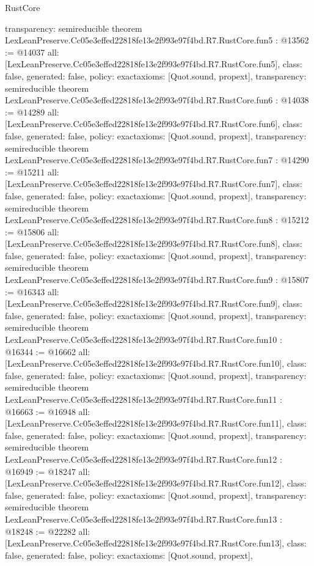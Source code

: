 \begin{lexlean}{RustCore}
\begin{coremodule}
{  transparency: semireducible
}
theorem LexLeanPreserve.Cc05e3effed22818fe13e2f993e97f4bd.R7.RustCore.fun5 : @13562 := @14037 {
  all: [LexLeanPreserve.Cc05e3effed22818fe13e2f993e97f4bd.R7.RustCore.fun5],
  class: false,
  generated: false,
  policy: exact{axioms: [Quot.sound, propext]},
  transparency: semireducible
}
theorem LexLeanPreserve.Cc05e3effed22818fe13e2f993e97f4bd.R7.RustCore.fun6 : @14038 := @14289 {
  all: [LexLeanPreserve.Cc05e3effed22818fe13e2f993e97f4bd.R7.RustCore.fun6],
  class: false,
  generated: false,
  policy: exact{axioms: [Quot.sound, propext]},
  transparency: semireducible
}
theorem LexLeanPreserve.Cc05e3effed22818fe13e2f993e97f4bd.R7.RustCore.fun7 : @14290 := @15211 {
  all: [LexLeanPreserve.Cc05e3effed22818fe13e2f993e97f4bd.R7.RustCore.fun7],
  class: false,
  generated: false,
  policy: exact{axioms: [Quot.sound, propext]},
  transparency: semireducible
}
theorem LexLeanPreserve.Cc05e3effed22818fe13e2f993e97f4bd.R7.RustCore.fun8 : @15212 := @15806 {
  all: [LexLeanPreserve.Cc05e3effed22818fe13e2f993e97f4bd.R7.RustCore.fun8],
  class: false,
  generated: false,
  policy: exact{axioms: [Quot.sound, propext]},
  transparency: semireducible
}
theorem LexLeanPreserve.Cc05e3effed22818fe13e2f993e97f4bd.R7.RustCore.fun9 : @15807 := @16343 {
  all: [LexLeanPreserve.Cc05e3effed22818fe13e2f993e97f4bd.R7.RustCore.fun9],
  class: false,
  generated: false,
  policy: exact{axioms: [Quot.sound, propext]},
  transparency: semireducible
}
theorem LexLeanPreserve.Cc05e3effed22818fe13e2f993e97f4bd.R7.RustCore.fun10 : @16344 := @16662 {
  all: [LexLeanPreserve.Cc05e3effed22818fe13e2f993e97f4bd.R7.RustCore.fun10],
  class: false,
  generated: false,
  policy: exact{axioms: [Quot.sound, propext]},
  transparency: semireducible
}
theorem LexLeanPreserve.Cc05e3effed22818fe13e2f993e97f4bd.R7.RustCore.fun11 : @16663 := @16948 {
  all: [LexLeanPreserve.Cc05e3effed22818fe13e2f993e97f4bd.R7.RustCore.fun11],
  class: false,
  generated: false,
  policy: exact{axioms: [Quot.sound, propext]},
  transparency: semireducible
}
theorem LexLeanPreserve.Cc05e3effed22818fe13e2f993e97f4bd.R7.RustCore.fun12 : @16949 := @18247 {
  all: [LexLeanPreserve.Cc05e3effed22818fe13e2f993e97f4bd.R7.RustCore.fun12],
  class: false,
  generated: false,
  policy: exact{axioms: [Quot.sound, propext]},
  transparency: semireducible
}
theorem LexLeanPreserve.Cc05e3effed22818fe13e2f993e97f4bd.R7.RustCore.fun13 : @18248 := @22282 {
  all: [LexLeanPreserve.Cc05e3effed22818fe13e2f993e97f4bd.R7.RustCore.fun13],
  class: false,
  generated: false,
  policy: exact{axioms: [Quot.sound, propext]},
}
\end{coremodule}
\end{lexlean}
